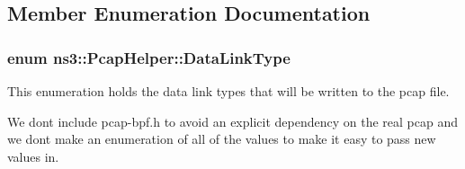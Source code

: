 \subsection{Member Enumeration Documentation}
\subsubsection[{\texorpdfstring{Data\+Link\+Type}{DataLinkType}}]{\setlength{\rightskip}{0pt plus 5cm}enum {\bf ns3\+::\+Pcap\+Helper\+::\+Data\+Link\+Type}}\hypertarget{classns3_1_1PcapHelper_a2ee4dad28ddd9a1fe636f51835eaa77f}{}\label{classns3_1_1PcapHelper_a2ee4dad28ddd9a1fe636f51835eaa77f}
This enumeration holds the data link types that will be written to the pcap file.

We don\textquotesingle{}t include pcap-\/bpf.\+h to avoid an explicit dependency on the real pcap and we don\textquotesingle{}t make an enumeration of all of the values to make it easy to pass new values in.

